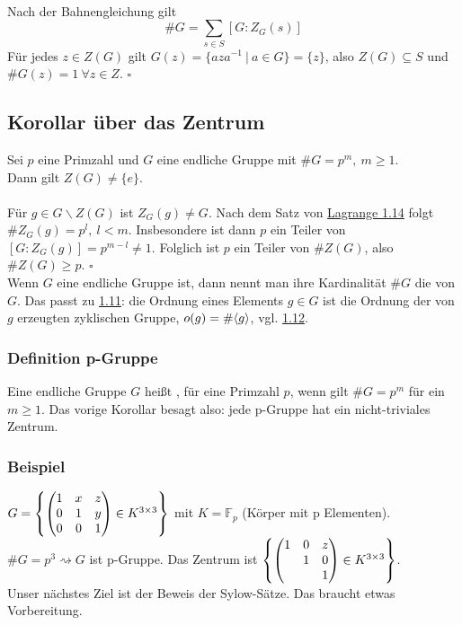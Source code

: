 \\
Nach der Bahnengleichung gilt \[\#G=\sum_{s\in S}[G:Z_G(s)] \]
Für jedes $z\in Z(G)$ gilt $G(z)=\{aza^{-1}~|~a\in G \}=\{z\}$, also $Z(G)\subseteq S$ und $\#G(z)=1~\forall z\in Z$.
\hfill $\square$


\subsection{Korollar über das Zentrum}
\label{sub:kor_zentrum}
Sei $p$ eine Primzahl und $G$ eine endliche Gruppe mit $\#G=p^m,~m\ge 1$.\\
Dann gilt $Z(G)\not= \{e\}$.\\

\\
Für $g\in G\backslash Z(G)$ ist $Z_G(g)\not= G$. 
Nach dem Satz von \hyperref[sub:satz_von_lagrange]{Lagrange 1.14} folgt $\#Z_G(g)=p^l,~l<m$. 
Insbesondere ist dann $p$ ein Teiler von $[G:Z_G(g)]=p^{m-l}\not=1$. 
Folglich ist $p$ ein Teiler von $\#Z(G)$, also $\#Z(G)\ge p$.
\hfill $\square$\\

Wenn $G$ eine endliche Gruppe ist, dann nennt man ihre Kardinalität $\#G$ die  von $G$. 
Das passt zu \hyperref[sub:def_zyklische_gruppen]{1.11}: 
die Ordnung eines Elements $g\in G$ ist die Ordnung der von $g$ erzeugten zyklischen Gruppe, $o(g)=\#\langle g \rangle$, vgl. \hyperref[sub:zyklische_gruppen]{1.12}.

\subsubsection*{Definition p-Gruppe}
Eine endliche Gruppe $G$ heißt , für eine Primzahl $p$, wenn gilt $\#G=p^m$ für ein $m\ge 1$. 
Das vorige Korollar besagt also: jede p-Gruppe hat ein nicht-triviales Zentrum.

\subsubsection*{Beispiel}
$G=\left\{\begin{pmatrix}
1&x&z\\ 0&1&y\\ 0&0&1 \end{pmatrix} \in K^{3\times 3}\right\}$ mit $K=\mathds{F}_p$ (Körper mit p Elementen).\\
$\#G=p^3 \rightsquigarrow G$ ist p-Gruppe. 
Das Zentrum ist $\left\{\begin{pmatrix}1&0&z\\&1&0\\&&1\end{pmatrix} \in K^{3\times 3}\right\}$.\\
Unser nächstes Ziel ist der Beweis der Sylow-Sätze. 
Das braucht etwas Vorbereitung.

